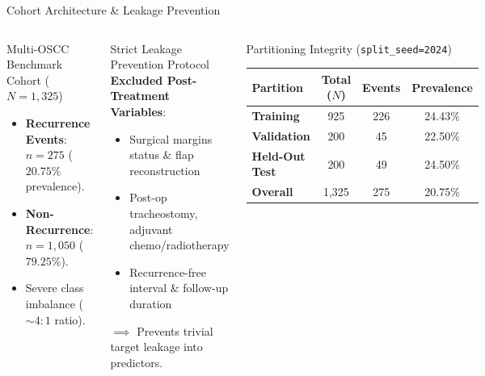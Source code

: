 \documentclass[10pt,aspectratio=169,xcolor={table,dvipsnames}]{beamer}
\begin{document}
\begin{frame}{Cohort Architecture \& Leakage Prevention}
  \begin{columns}[c]
      \begin{block}{Multi-OSCC Benchmark Cohort ($N = 1,325$)}
        \begin{itemize}\setlength{\itemsep}{3pt}
          \item \textbf{Recurrence Events}: $n = 275$ ($20.75\%$ prevalence).
          \item \textbf{Non-Recurrence}: $n = 1,050$ ($79.25\%$).
          \item Severe class imbalance ($\sim 4:1$ ratio).
        \end{itemize}
      \end{block}

      \begin{alertblock}{Strict Leakage Prevention Protocol}
        \textbf{Excluded Post-Treatment Variables}:
        \begin{itemize}\setlength{\itemsep}{1pt}
          \item Surgical margins status \& flap reconstruction
          \item Post-op tracheostomy, adjuvant chemo/radiotherapy
          \item Recurrence-free interval \& follow-up duration
        \end{itemize}
        {\scriptsize $\implies$ Prevents trivial target leakage into predictors.}
      \end{alertblock}

      \begin{block}{Partitioning Integrity (\texttt{split\_seed=2024})}
        \centering
        \small
        \begin{tabular}{lccc}
          \toprule
          \textbf{Partition} & \textbf{Total ($N$)} & \textbf{Events} & \textbf{Prevalence} \\
          \midrule
          \textbf{Training}   & 925 & 226 & 24.43\% \\
          \textbf{Validation} & 200 & 45  & 22.50\% \\
          \textbf{Held-Out Test}& 200 & 49  & 24.50\% \\
          \midrule
          \textbf{Overall}    & 1,325 & 275 & 20.75\% \\
          \bottomrule
        \end{tabular}
      \end{block}


\end{columns}
\end{frame}
\end{document}
